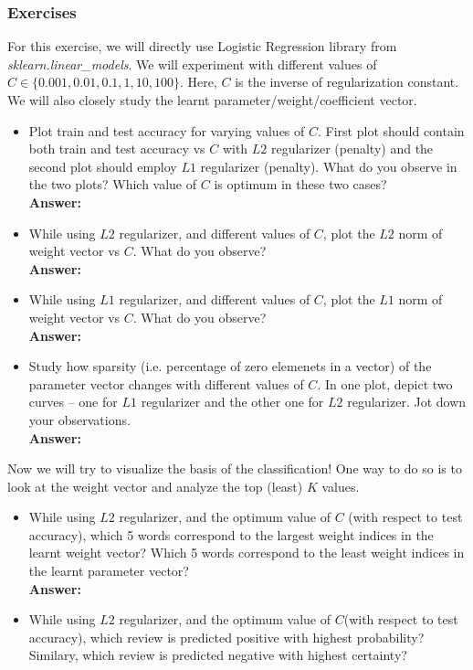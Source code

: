 \documentclass{article}
\begin{document}
\subsubsection*{Exercises}

For this exercise, we will directly use Logistic Regression library from \textit{sklearn.linear\_models}. We will experiment with different values of $C \in \{0.001,0.01,0.1,1,10,100\}$. Here, $C$ is the inverse of regularization constant. We will also closely study the learnt parameter/weight/coefficient vector.
\begin{itemize}
	\item Plot train and test accuracy for varying values of $C$. First plot should contain both train and test accuracy vs $C$ with $L2$ regularizer (penalty) and the second plot should employ $L1$ regularizer (penalty). What do you observe in the two plots? Which value of $C$ is optimum in these two cases?
	\\\textbf{Answer:}\\
	
	\item While using $L2$ regularizer, and different values of $C$, plot the $L2$ norm of weight vector vs $C$. What do you observe?
	\\\textbf{Answer:}\\
	
	\item While using $L1$ regularizer, and different values of $C$, plot the $L1$ norm of weight vector vs $C$. What do you observe?
	\\\textbf{Answer:}\\
	
	\item Study how sparsity (i.e. percentage of zero elemenets in a vector) of the parameter vector changes with different values of $C$. In one plot, depict two curves -- one for $L1$ regularizer and the other one for $L2$ regularizer. Jot down your observations.
	\\\textbf{Answer:}\\
	
\end{itemize}

Now we will try to visualize the basis of the classification! One way to do so is to look at the weight vector and analyze the top (least) $K$ values.
\begin{itemize}
	\item While using $L2$ regularizer, and the optimum value of $C$ (with respect to test accuracy), which 5 words correspond to the largest weight indices in the learnt weight vector? Which 5 words correspond to the least weight indices in the learnt parameter vector?
	\\\textbf{Answer:}\\
	
	\item While using $L2$ regularizer, and the optimum value of $C$(with respect to test accuracy), which review is predicted positive with highest probability? Similary, which review is predicted negative with highest certainty?
\end{itemize}
\end{document}

